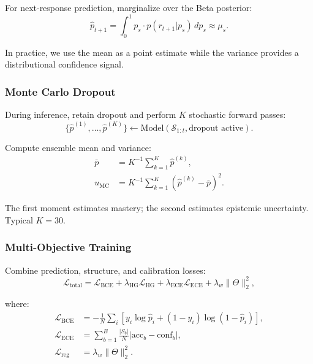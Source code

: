 \documentclass[preprint,12pt]{elsarticle}
\begin{document}
For next-response prediction, marginalize over the Beta posterior:
\begin{equation}
\hat{p}_{t+1} = \int_0^1 p_s \cdot p(r_{t+1} | p_s) \, dp_s \approx \mu_s.
\end{equation}

In practice, we use the mean as a point estimate while the variance provides a distributional confidence signal.

\subsubsection{Monte Carlo Dropout}

During inference, retain dropout and perform $K$ stochastic forward passes:
\begin{equation}
\{\hat{p}^{(1)}, \ldots, \hat{p}^{(K)}\} \leftarrow \text{Model}(\mathcal{S}_{1:t}, \text{dropout active}).
\label{eq:mc-samples}
\end{equation}

Compute ensemble mean and variance:
\begin{align}
\bar{p} &= K^{-1}\sum_{k=1}^K \hat{p}^{(k)},\label{eq:mc-mean}\\
u_{\text{MC}} &= K^{-1}\sum_{k=1}^K (\hat{p}^{(k)} - \bar{p})^2.\label{eq:mc-var}
\end{align}

The first moment estimates mastery; the second estimates epistemic uncertainty. Typical $K = 30$.

\subsubsection{Multi-Objective Training}

Combine prediction, structure, and calibration losses:
\begin{equation}
\mathcal{L}_{\text{total}} = \mathcal{L}_{\text{BCE}} + \lambda_{\text{HG}} \mathcal{L}_{\text{HG}} + \lambda_{\text{ECE}} \mathcal{L}_{\text{ECE}} + \lambda_w \|\Theta\|_2^2,
\label{eq:total-loss}
\end{equation}

where:
\begin{align}
\mathcal{L}_{\text{BCE}} &= -\frac{1}{N}\sum_i [y_i \log\hat{p}_i + (1-y_i)\log(1-\hat{p}_i)],\\
\mathcal{L}_{\text{ECE}} &= \sum_{b=1}^B \frac{|S_b|}{N} |\text{acc}_b - \text{conf}_b|,\\
\mathcal{L}_{\text{reg}} &= \lambda_w \|\Theta\|_2^2.
\end{align}
\end{document}
